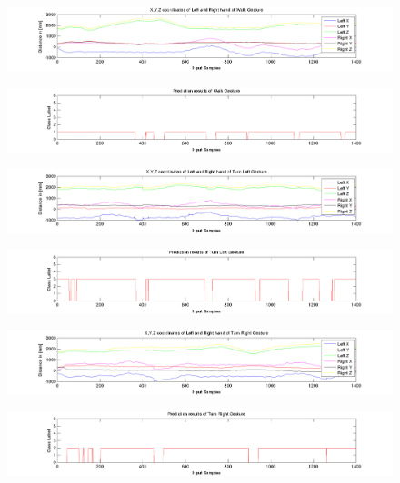 \begin{figure}
	[h] 	
	\centerline{\includegraphics[width=180mm]{figures/result/test-axis-walk.jpg}}
\end{figure}
\begin{figure}
	[h] 	
	\centerline{\includegraphics[width=180mm]{figures/result/test-prediction-walk.jpg}}
\end{figure}
\begin{figure}
	[h]
	\centerline{\includegraphics[width=180mm]{figures/result/test-axis-turn-left.jpg}}
\end{figure}
\label{ev:test:prediction}
\begin{figure}
	[h]
	\centerline{\includegraphics[width=180mm]{figures/result/test-prediction-turn-left.jpg}}
\end{figure}
\begin{figure}
	[h] 	
	\centerline{\includegraphics[width=180mm]{figures/result/test-axis-turn-right.jpg}}
\end{figure}
\begin{figure}
	[h] 	
	\centerline{\includegraphics[width=180mm]{figures/result/test-prediction-turn-right.jpg}}
\end{figure}
